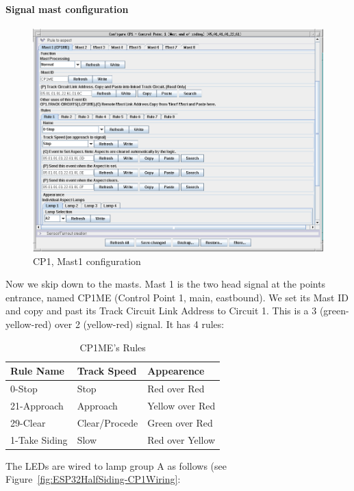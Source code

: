 \paragraph{Signal mast configuration}
\begin{figure}[hbpt]\begin{centering}%
\includegraphics[width=5in]{CP1-Mast1-Config.png}
\caption{CP1, Mast1 configuration}
\label{fig:CP1-Mast1-Config}
\end{centering}\end{figure}
Now we skip down to the masts. Mast 1 is the two head signal at the points
entrance, named CP1ME (Control Point 1, main, eastbound). We set its Mast ID
and copy and past its Track Circuit Link Address to Circuit 1. This is a 3
(green-yellow-red) over 2 (yellow-red) signal. It has 4 rules:
\begin{table}[htdp]\begin{centering}\begin{tabular}{|l|l|l|}
\hline
Rule Name&Track Speed&Appearence\\
\hline
0-Stop&Stop&Red over Red\\
21-Approach&Approach&Yellow over Red\\
29-Clear&Clear/Procede&Green over Red\\
1-Take Siding&Slow&Red over Yellow\\
\hline
\end{tabular}
\caption{CP1ME's Rules}
\label{tab:CP1MERules}
\end{centering}\end{table}
The LEDs are wired to lamp group A as follows (see Figure~\ref{fig:ESP32HalfSiding-CP1Wiring}: 
